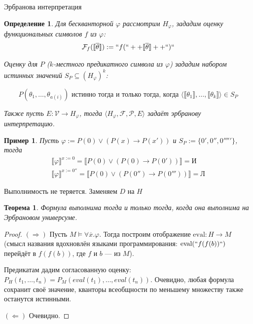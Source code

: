 \documentclass[aspectratio=169]{beamer}
\newtheorem{thm}{Теорема}[section]
\newtheorem{dfn}{Определение}[section]
\newtheorem{exm}{Пример}[section]
\begin{document}
\begin{frame}{Эрбранова интерпретация}


\begin{dfn}Для бескванторной $\varphi$ рассмотрим $H_\varphi$,
зададим оценку функциональных символов $f$ из $\varphi$:
$$\mathcal{F}_f(\llbracket\overline{\theta}\rrbracket) := ``f(`` ++ \llbracket \overline{\theta} \rrbracket ++ ``)``$$

Оценку для $P$ ($k$-местного предикатного символа из $\varphi$)
зададим набором истинных значений $S_P \subseteq (H_\varphi)^k$:\vspace{-0.3cm}

$$P(\theta_1,\dots,\theta_{a(i)}) \text{ истинно тогда и только тогда, когда }
\langle\llbracket\theta_1\rrbracket,\dots,\llbracket\theta_k\rrbracket\rangle \in S_P$$

Также пусть $E: \mathcal{V}\rightarrow H_\varphi$, тогда 
$\langle H_\varphi, \mathcal{F}, \mathcal{P}, E\rangle$
задаёт \emph{эрбранову интерпретацию}.
\end{dfn}


\begin{exm}
Пусть $\varphi := P(0)\vee (P(x)\rightarrow P(x'))$ и $S_P := \{0', 0'', 0'''''\}$, тогда
$$\begin{array}{l}\llbracket \varphi \rrbracket^{ x:=0 } = \llbracket P(0)\vee (P(0)\rightarrow P(0')) \rrbracket = \text{И}\\
\llbracket \varphi \rrbracket^{ x:=0'' } = \llbracket P(0)\vee (P(0'')\rightarrow P(0'''))\rrbracket = \text{Л}\end{array}$$
\end{exm}
\end{frame}

\begin{frame}{Выполнимость не теряется. Заменяем $D$ на $H$}
\begin{thm}Формула выполнима тогда и только тогда, когда она выполнима на Эрбрановом универсуме.\end{thm}
\begin{proof}
$(\Rightarrow)$ Пусть $M \models\forall \overline{x}.\varphi$. Тогда построим отображение $\text{eval}: H \rightarrow M$
(смысл названия вдохновлён языками программирования: $\text{eval}(``f(f(b))``)$ перейдёт в $f(f(b))$, где $f$ и $b$ --- из $M$).

Предикатам дадим согласованную оценку:
$P_H(t_1,\dots,t_n) = P_M(eval(t_1),\dots,eval(t_n))$. Очевидно, любая формула сохранит своё значение, кванторы всеобщности
по меньшему множеству также останутся истинными.

$(\Leftarrow)$ Очевидно.
\end{proof}\end{frame}
\end{document}
